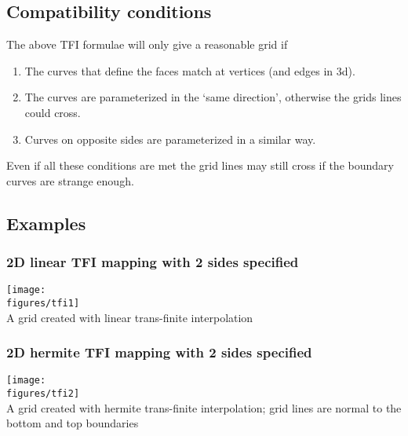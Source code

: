 \subsection{Compatibility conditions}
  The above TFI formulae will only give a reasonable grid if
\begin{enumerate}
  \item The curves that define the faces match at vertices (and edges in 3d).
  \item The curves are parameterized in the `same direction', otherwise the
        grids lines could cross.
  \item Curves on opposite sides are parameterized in a similar way.
\end{enumerate}
Even if all these conditions are met the grid lines may still cross if the boundary curves
are strange enough.


\subsection{Examples}
\subsubsection{2D linear TFI mapping with 2 sides specified}
\noindent
\begin{minipage}{.4\linewidth}
{\footnotesize
{}
}
\end{minipage}\hfill
\begin{minipage}{.6\linewidth}
  \begin{center}
   \texttt{[image: \\figures/tfi1]} \\
  {A grid created with linear trans-finite interpolation}  \label{fig:tfi1}
  \end{center}
\end{minipage}

\subsubsection{2D hermite TFI mapping with 2 sides specified}
\noindent
\begin{minipage}{.4\linewidth}
{\footnotesize
{}
}
\end{minipage}\hfill
\begin{minipage}{.6\linewidth}
  \begin{center}
   \texttt{[image: \\figures/tfi2]} \\
  {A grid created with hermite trans-finite interpolation; grid lines are normal to the 
       bottom and top boundaries}  \label{fig:tfi2}
  \end{center}
\end{minipage}

